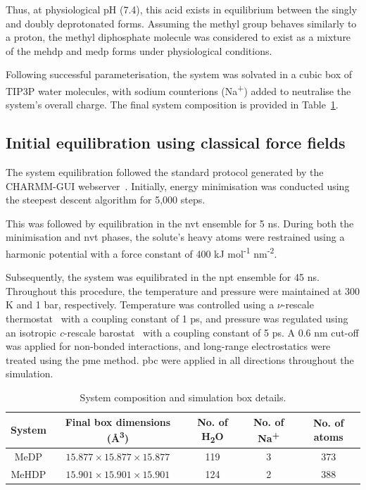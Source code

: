 Thus, at physiological pH (7.4), this acid exists in equilibrium between the singly and doubly deprotonated forms. Assuming the methyl group behaves similarly to a proton, the methyl diphosphate molecule was considered to exist as a mixture of the \ac{mehdp} and \ac{medp} forms under physiological conditions.

Following successful parameterisation, the system was solvated in a cubic box of TIP3P water molecules, with sodium counterions (Na\textsuperscript{+}) added to neutralise the system's overall charge. The final system composition is provided in Table~\ref{tab:system-before-equilibration}.



\subsection{Initial equilibration using classical force fields}
The system equilibration followed the standard protocol generated by the CHARMM-GUI webserver~\citep{joCHARMMGUIWebbasedGraphical2008}. Initially, energy minimisation was conducted using the steepest descent algorithm for 5,000 steps.

This was followed by equilibration in the \ac{nvt} ensemble for 5 ns. During both the minimisation and \ac{nvt} phases, the solute's heavy atoms were restrained using a harmonic potential with a force constant of 400 kJ mol\textsuperscript{-1} nm\textsuperscript{-2}.

Subsequently, the system was equilibrated in the \ac{npt} ensemble for 45 ns. Throughout this procedure, the temperature and pressure were maintained at 300 K and 1 bar, respectively. Temperature was controlled using a $\nu$-rescale thermostat~\citep{bussiCanonicalSamplingVelocity2007} with a coupling constant of 1 ps, and pressure was regulated using an isotropic \textit{c}-rescale barostat~\citep{bernettiPressureControlUsing2020} with a coupling constant of 5 ps. A 0.6 nm cut-off was applied for non-bonded interactions, and long-range electrostatics were treated using the \ac{pme} method. \Ac{pbc} were applied in all directions throughout the simulation.

\begin{table}[b]
    \centering
    \caption{System composition and simulation box details.}
    \label{tab:system-before-equilibration}
    \begin{tabular}{ccccc}
    \toprule
    \textbf{System} & \textbf{Final box dimensions (\AA\textsuperscript{3})} & \textbf{No. of H\textsubscript{2}O} & \textbf{No. of Na\textsuperscript{+}} & \textbf{No. of atoms} \\
    \midrule
    MeDP  & $15.877 \times 15.877 \times 15.877$ & 119 & 3 & 373 \\
    MeHDP & $15.901 \times 15.901 \times 15.901$ & 124 & 2 & 388 \\
    \bottomrule
    \end{tabular}
\end{table}

